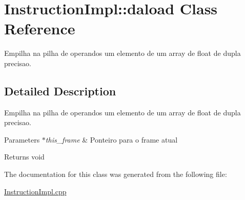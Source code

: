 \hypertarget{class_instruction_impl_1_1daload}{}\section{Instruction\+Impl\+:\+:daload Class Reference}
\label{class_instruction_impl_1_1daload}


Empilha na pilha de operandos um elemento de um array de float de dupla precisao.  




\subsection{Detailed Description}
Empilha na pilha de operandos um elemento de um array de float de dupla precisao. 


\begin{DoxyParams}{Parameters}
{\em $\ast$this\+\_\+frame} & Ponteiro para o frame atual \\
\hline
\end{DoxyParams}
\begin{DoxyReturn}{Returns}
void 
\end{DoxyReturn}


The documentation for this class was generated from the following file\+:\begin{DoxyCompactItemize}
\item 
\hyperlink{_instruction_impl_8cpp}{Instruction\+Impl.\+cpp}\end{DoxyCompactItemize}

